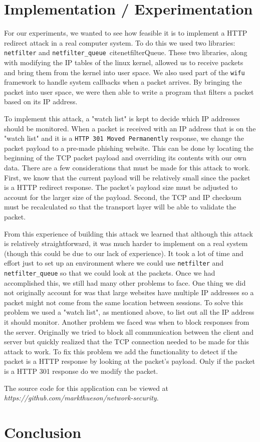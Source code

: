 \documentclass{article}
\begin{document}
\section{Implementation / Experimentation}
For our experiments, we wanted to see how feasible it is to implement a HTTP redirect attack in a real computer system. To do this we used two libraries: \texttt{netfilter} \cite{netfilter} and \texttt{netfilter\_queue}\ cite{netfilterQueue}. These two libraries, along with modifying the IP tables of the linux kernel, allowed us to receive packets and bring them from the kernel into user space. We also used part of the \texttt{wifu}\cite{wifu} framework to handle system callbacks when a packet arrives. By bringing the packet into user space, we were then able to write a program that filters a packet based on its IP address. 

To implement this attack, a "watch list" is kept to decide which IP addresses should be monitored. When a packet is received with an IP address that is on the "watch list" and it is a \texttt{HTTP 301 Moved Permanently} response, we change the packet payload to a pre-made phishing website. This can be done by locating the beginning of the TCP packet payload and overriding its contents with our own data. There are a few considerations that must be made for this attack to work. First, we know that the current payload will be relatively small since the packet is a HTTP redirect response. The packet's payload size must be adjusted to account for the larger size of the payload. Second, the TCP and IP checksum must be recalculated so that the transport layer will be able to validate the packet.

From this experience of building this attack we learned that although this attack is relatively straightforward, it was much harder to implement on a real system (though this could be due to our lack of experience). It took a lot of time and effort just to set up an environment where we could use \texttt{netfilter} and \texttt{netfilter\_queue} so that we could look at the packets. Once we had accomplished this, we still had many other problems to face. One thing we did not originally account for was that large websites have multiple IP addresses so a packet might not come from the same location between sessions. To solve this problem we used a "watch list", as mentioned above, to list out all the IP address it should monitor. Another problem we faced was when to block responses from the server. Originally we tried to block all communication between the client and server but quickly realized that the TCP connection needed to be made for this attack to work. To fix this problem we add the functionality to detect if the packet is a HTTP response by looking at the packet's payload. Only if the packet is a HTTP 301 response do we modify the packet.

The source code for this application can be viewed at {\em https://github.com/markthueson/network-security}.

\section{Conclusion}



\end{document}

